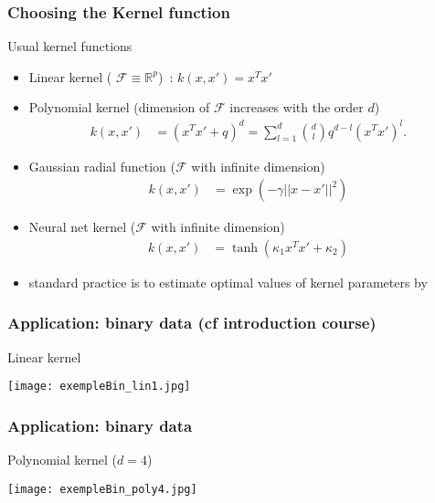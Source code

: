 \begin{frame}
  \frametitle{Choosing the Kernel function}


  \begin{block}{Usual kernel functions}
\begin{itemize}
 \item  Linear kernel ( $\mathcal{F} \equiv \mathbb{R}^p$)~:
 $
    k(x,x') =x^T x'
$
 \item  Polynomial kernel (dimension of $\mathcal{F}$ increases with the order $d$)
 \begin{align*}
    k(x,x') &=(x^T x'+q)^d = \sum_{l=1}^d\binom{d}{l}q^{d-l}(x^Tx')^l.
 \end{align*}
  \item Gaussian radial function ($\mathcal{F}$ with infinite dimension)
 \begin{align*}
    k(x,x') &= \exp{\left( - \gamma ||x - x'||^2\right)}
 \end{align*}
   \item  Neural net kernel ($\mathcal{F}$ with infinite dimension)
 \begin{align*}
    k(x,x') &= \tanh{\left( \kappa_1 x^T x' + \kappa_2 \right)}
 \end{align*}
\item[\doigt] standard practice is to estimate optimal values of kernel parameters  by 
\end{itemize}
 \end{block}

\end{frame}


\begin{frame}
  \frametitle{Application: binary data  (cf introduction course)}

  \begin{block}{Linear kernel}
    \begin{center}
      \texttt{[image: exempleBin\_lin1.jpg]}%
    \end{center}
  \end{block}
\end{frame}

\begin{frame}
  \frametitle{Application: binary data}


  \begin{block}{Polynomial kernel ($d=4$)}
    \begin{center}
      \texttt{[image: exempleBin\_poly4.jpg]}\\
    \end{center}

  \end{block}
\end{frame}


